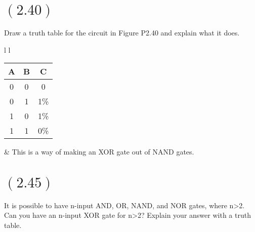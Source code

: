 \documentclass[letterpaper,12pt,titlepage]{article}
\begin{document}
\section*{$(2.40)$} Draw a truth table for the circuit in Figure P2.40 and explain what it does.\\
\begin{tabular}{l l}
 \begin{tabular}{c | c | c}
A & B & C \\ \hline
0 & 0 & 0 \\
0 & 1 & 1\% \\
1 & 0 & 1\% \\
1 & 1 & 0\% \\
\end{tabular}
& This is a way of making an XOR gate out of NAND gates. 
\end{tabular}

\section*{$(2.45)$} It is possible to have n-input AND, OR, NAND, and NOR gates, where n\textgreater 2. Can you have an n-input XOR gate for n\textgreater 2? Explain your answer with a truth table.
\end{document}
